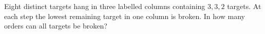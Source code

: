 Eight distinct targets hang in three labelled columns containing $3,3,2$ targets. At each step the lowest remaining target in one column is broken. In how many orders can all targets be broken?
